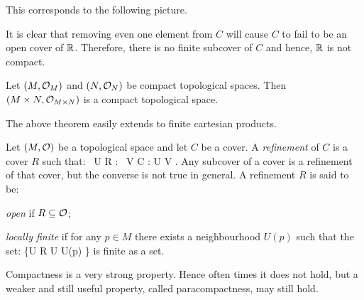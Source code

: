 This corresponds to the following picture.

\begin{figure}[h!]
\centering
{}
\end{figure}

It is clear that removing even one element from $C$ will cause $C$ to fail to be an open cover of $\mathbb{R}$. Therefore, there is no finite subcover of $C$ and hence, $\mathbb{R}$ is not compact.
\ee

\bt
Let $(M,\mathcal{O}_M)$ and $(N,\mathcal{O}_N)$ be compact topological spaces. Then $(M\times N,\mathcal{O}_{M\times N})$ is a compact topological space.
\et

The above theorem easily extends to finite cartesian products. 

\bd
Let $(M,\mathcal{O})$ be a topological space and let $C$ be a cover. A \emph{refinement} of $C$ is a cover $R$ such that:
\bse
\forall \, U \in R : \exists \, V \in C : U \se V .
\ese
\ed
Any subcover of a cover is a refinement of that cover, but the converse is not true in general. A refinement $R$ is said to be:
\bit
\item \emph{open} if $R\subseteq \mathcal{O}$;
\item \emph{locally finite} if for any $p\in M$ there exists a neighbourhood $U(p)$ such that the set:
\bse
\{U \in R \mid U \cap U(p) \neq \vn\}
\ese
is finite as a set.
\eit

Compactness is a very strong property. Hence often times it does not hold, but a weaker and still useful property, called paracompactness, may still hold.

